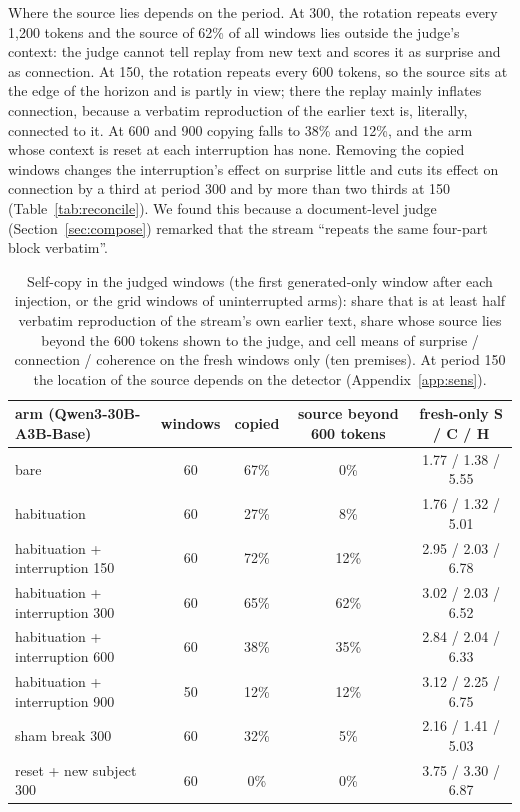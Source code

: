 \documentclass[11pt]{article}
\begin{document}
Where the source lies depends on the period. At 300, the rotation repeats
every 1,200 tokens and the source of 62\% of all windows lies outside the
judge's context: the judge cannot tell replay from new text and scores it as
surprise and as connection. At 150, the rotation repeats every 600 tokens,
so the source sits at the edge of the horizon and is partly in view; there
the replay mainly inflates connection, because a verbatim reproduction of
the earlier text is, literally, connected to it. At 600 and 900 copying falls
to 38\% and 12\%, and the arm whose context is reset at each interruption
has none. Removing the copied windows changes the interruption's effect on
surprise little and cuts its effect on connection by a third at period 300
and by more than two thirds at 150 (Table~\ref{tab:reconcile}). We found this because a
document-level judge (Section~\ref{sec:compose}) remarked that the stream
``repeats the same four-part block verbatim''.

\begin{table}[t]
\centering\small
\begin{tabular}{@{}lcccc@{}}
\toprule
arm (Qwen3-30B-A3B-Base) & windows & copied & source beyond 600 tokens & fresh-only S / C / H \\
\midrule
bare & 60 & 67\% & 0\% & 1.77 / 1.38 / 5.55 \\
habituation & 60 & 27\% & 8\% & 1.76 / 1.32 / 5.01 \\
habituation + interruption 150 & 60 & 72\% & 12\% & 2.95 / 2.03 / 6.78 \\
habituation + interruption 300 & 60 & 65\% & 62\% & 3.02 / 2.03 / 6.52 \\
habituation + interruption 600 & 60 & 38\% & 35\% & 2.84 / 2.04 / 6.33 \\
habituation + interruption 900 & 50 & 12\% & 12\% & 3.12 / 2.25 / 6.75 \\
sham break 300 & 60 & 32\% & 5\% & 2.16 / 1.41 / 5.03 \\
reset + new subject 300 & 60 & 0\% & 0\% & 3.75 / 3.30 / 6.87 \\
\bottomrule
\end{tabular}
\caption{Self-copy in the judged windows (the first generated-only window
after each injection, or the grid windows of uninterrupted arms): share that
is at least half verbatim reproduction of the stream's own earlier text,
share whose source lies beyond the 600 tokens shown to the judge, and cell
means of surprise / connection / coherence on the fresh windows only (ten
premises). At period 150 the location of the source depends on the
detector (Appendix~\ref{app:sens}).}
\label{tab:copy}
\end{table}
\end{document}
